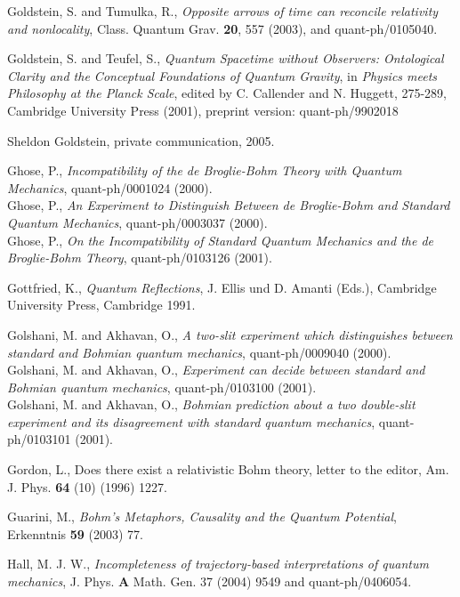 \begin{thebibliography}{10}
 Goldstein, S. and Tumulka, R., {\em Opposite arrows of
  time can reconcile relativity and nonlocality}, Class. Quantum
  Grav. {\bf 20}, 557 (2003), and quant-ph/0105040.

 Goldstein, S. and Teufel, S., {\em Quantum Spacetime without Observers: Ontological Clarity and the Conceptual 
  Foundations of Quantum Gravity}, in {\em Physics meets Philosophy at the Planck Scale}, edited by C. Callender and N. Huggett, 
  275-289, Cambridge University Press (2001), preprint version: quant-ph/9902018  

 Sheldon Goldstein, private communication, 2005.

  Ghose, P., {\em Incompatibility of the de Broglie-Bohm Theory with Quantum Mechanics}, 
  quant-ph/0001024 (2000).\\
  Ghose, P., {\em An Experiment to Distinguish Between de Broglie-Bohm and Standard 
    Quantum Mechanics}, quant-ph/0003037 (2000).\\
  Ghose, P., {\em On the Incompatibility of Standard Quantum Mechanics and the de 
    Broglie-Bohm Theory}, quant-ph/0103126 (2001).

 Gottfried, K., {\em Quantum Reflections}, J. Ellis und D. Amanti (Eds.), Cambridge University Press, 
  Cambridge 1991. 

Golshani, M. and Akhavan, O., {\em A two-slit experiment which distinguishes between 
  standard and Bohmian quantum mechanics}, quant-ph/0009040 (2000).\\
Golshani, M. and Akhavan, O., {\em Experiment can decide between standard and Bohmian 
quantum mechanics}, quant-ph/0103100 (2001).\\
Golshani, M. and Akhavan, O., {\em Bohmian prediction about a two double-slit experiment 
and its disagreement with standard quantum mechanics}, quant-ph/0103101 (2001).

 Gordon, L., {Does there exist a relativistic Bohm theory}, letter to the editor, Am. J. Phys. {\bf 64} (10) (1996) 1227. 

 Guarini, M., {\em Bohm's Metaphors, Causality and the Quantum Potential}, Erkenntnis {\bf 59} (2003) 77.

 Hall, M. J. W., {\em Incompleteness of trajectory-based interpretations of quantum mechanics}, J. Phys. {\bf A} 
  Math. Gen. 37 (2004) 9549 and quant-ph/0406054.


\end{thebibliography}
